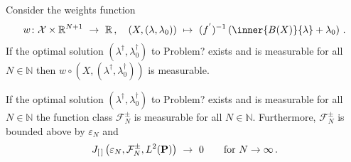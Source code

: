 \begin{lemma}
  Consider the weights function
  \begin{align*}
    w
    \colon
    \mathcal{X}
    \times
    \R^{N+1}
    \ 
    \to
    \ 
    \R
    \,,
    \quad
    (X,(\lambda,\lambda_0))
    \ 
    \mapsto
    \ 
    (
    f^{'}
    )^{-1}
    \left( 
      \inner{B(X)}{\lambda}
      +
      \lambda_0
    \right)
    \,.
  \end{align*}
    If the optimal solution 
    $
    (\lambda^\dagger,\lambda_0^\dagger)
    $ to Problem? exists and is measurable for all $N\in\mathbb{N}$ 
    then $
    w
    \circ
    (
    X
    ,
    (\lambda^\dagger,\lambda_0^\dagger)
    )
    $
    is measurable.
\end{lemma}
\begin{lemma}
  \label{bounded_f_lemma}
    If the optimal solution $(\lambda^\dagger,\lambda_0^\dagger)$ to Problem? exists and is measurable for all $N\in\mathbb{N}$ 
  the function class
  $
    \mathcal{F}_N^\pm
  $
    is measurable for all $N\in\mathbb{N}$.
    Furthermore, $\mathcal{F}_N^\pm$ is bounded above by $\varepsilon_N$ and
    \begin{gather*}
     J_{[\, ]}
    \left( 
      \varepsilon_N
    ,
    \mathcal{F}_N^\pm
    ,
     L^2(\P)
    \right)
    \ 
    \to
    \ 
    0
    \qquad
    \text{for}
    \ 
    N
    \to
    \infty
\,. 
    \end{gather*}
\end{lemma}
